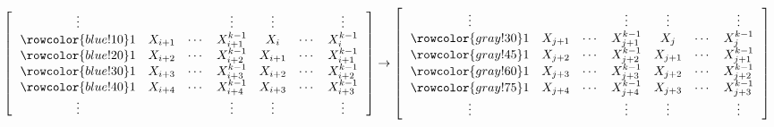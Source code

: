 \documentclass[11pt]{article}
\theoremstyle{plain}
\theoremstyle{definition}
\theoremstyle{remark}
\begin{document}
\begin{figure}
    \centering
    
        \begin{align*}
       \left[\,\,\,\,
        \begin{matrix}
            \vdots &&&\vdots&\vdots &&\vdots\\
            \rowcolor{blue!10} 1 & X_{i+1} & \cdots & X_{i+1}^{k-1} & X_{i} & \cdots & X_{i}^{k-1} \\
            \rowcolor{blue!20} 1 & X_{i+2} & \cdots & X_{i+2}^{k-1} & X_{i+1} & \cdots & X_{i+1}^{k-1} \\
            \rowcolor{blue!30} 1 & X_{i+3} & \cdots & X_{i+3}^{k-1} & X_{i+2} & \cdots & X_{i+2}^{k-1} \\
            \rowcolor{blue!40} 1 & X_{i+4} & \cdots & X_{i+4}^{k-1} & X_{i+3} & \cdots & X_{i+3}^{k-1} \\
            \vdots &&&\vdots&\vdots &&\vdots\\
        \end{matrix}
        \,\,\,\,
        \right]
        \rightarrow
        \left[\,\,\,\,
        \begin{matrix}
            \vdots &&&\vdots&\vdots &&\vdots\\
            \rowcolor{gray!30} 1 & X_{j+1} & \cdots & X_{j+1}^{k-1} & X_{j} & \cdots & X_{j}^{k-1} \\
            \rowcolor{gray!45} 1 & X_{j+2} & \cdots & X_{j+2}^{k-1} & X_{j+1} & \cdots & X_{j+1}^{k-1} \\
            \rowcolor{gray!60} 1 & X_{j+3} & \cdots & X_{j+3}^{k-1} & X_{j+2} & \cdots & X_{j+2}^{k-1} \\
            \rowcolor{gray!75} 1 & X_{j+4} & \cdots & X_{j+4}^{k-1} & X_{j+3} & \cdots & X_{j+3}^{k-1} \\
            \vdots &&&\vdots&\vdots &&\vdots\\
        \end{matrix}
        \,\,\,\,
        \right]
    \end{align*} 

\end{figure}
\end{document}
